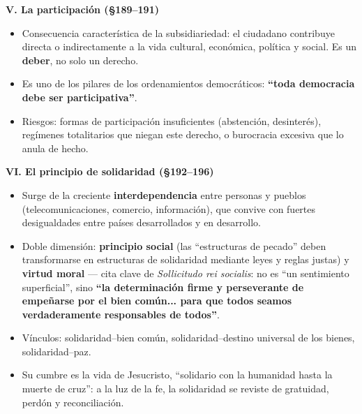 \documentclass[10pt,a4paper]{article}
\begin{document}
\medskip\noindent \textbf{V. La participación (\S{}189--191)}\par\nopagebreak
\begin{itemize}
\item Consecuencia característica de la subsidiariedad: el ciudadano contribuye directa o indirectamente a la vida cultural, económica, política y social. Es un \textbf{deber}, no solo un derecho.
\item Es uno de los pilares de los ordenamientos democráticos: \textbf{``toda democracia debe ser participativa''}.
\item Riesgos: formas de participación insuficientes (abstención, desinterés), regímenes totalitarios que niegan este derecho, o burocracia excesiva que lo anula de hecho.
\end{itemize}

\medskip\noindent \textbf{VI. El principio de solidaridad (\S{}192--196)}\par\nopagebreak
\begin{itemize}
\item Surge de la creciente \textbf{interdependencia} entre personas y pueblos (telecomunicaciones, comercio, información), que convive con fuertes desigualdades entre países desarrollados y en desarrollo.
\item Doble dimensión: \textbf{principio social} (las ``estructuras de pecado'' deben transformarse en estructuras de solidaridad mediante leyes y reglas justas) y \textbf{virtud moral} --- cita clave de \textit{Sollicitudo rei socialis}: no es ``un sentimiento superficial'', sino \textbf{``la determinación firme y perseverante de empeñarse por el bien común... para que todos seamos verdaderamente responsables de todos''}.
\item Vínculos: solidaridad--bien común, solidaridad--destino universal de los bienes, solidaridad--paz.
\item Su cumbre es la vida de Jesucristo, ``solidario con la humanidad hasta la muerte de cruz'': a la luz de la fe, la solidaridad se reviste de gratuidad, perdón y reconciliación.
\end{itemize}
\end{document}
